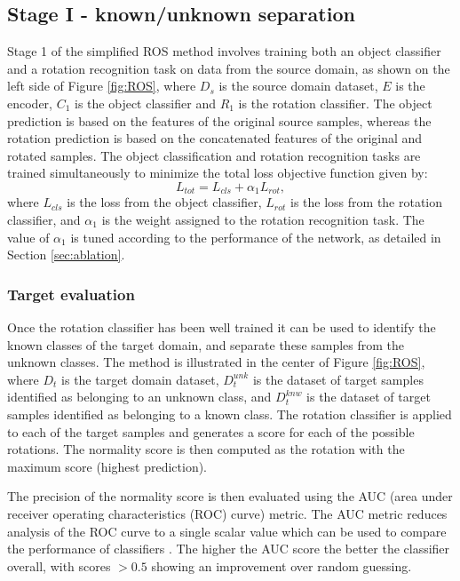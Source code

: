 \documentclass[10pt,twocolumn,letterpaper]{article}
\begin{document}
\subsection{Stage I - known/unknown separation}

Stage 1 of the simplified ROS method involves training both an object classifier and a rotation recognition task on data from the source domain, as shown on the left side of Figure \ref{fig:ROS}, where $D_s$ is the source domain dataset, $E$ is the encoder, $C_1$ is the object classifier and $R_1$ is the rotation classifier. The object prediction is based on the features of the original source samples, whereas the rotation prediction is based on the concatenated features of the original and rotated samples. The object classification and rotation recognition tasks are trained simultaneously to minimize the total loss objective function given by:
\begin{equation}
  L_{tot} = L_{cls} + \alpha_1 L_{rot} ,
  \label{eq:totalloss}
\end{equation}
where $L_{cls}$ is the loss from the object classifier, $L_{rot}$ is the loss from the rotation classifier, and $\alpha_1$ is the weight assigned to the rotation recognition task. The value of $\alpha_1$ is tuned according to the performance of the network, as detailed in Section \ref{sec:ablation}.


\subsubsection*{Target evaluation}

Once the rotation classifier has been well trained it can be used to identify the known classes of the target domain, and separate these samples from the unknown classes. The method is illustrated in the center of Figure \ref{fig:ROS}, where $D_t$ is the target domain dataset, $D_t^{unk}$ is the dataset of target samples identified as belonging to an unknown class, and $D^{knw}_t$ is the dataset of target samples identified as belonging to a known class. The rotation classifier is applied to each of the target samples and generates a score for each of the possible rotations. The normality score is then computed as the rotation with the maximum score (highest prediction).

The precision of the normality score is then evaluated using the AUC (area under receiver operating characteristics (ROC) curve) metric. The AUC metric reduces analysis of the ROC curve to a single scalar value which can be used to compare the performance of classifiers \cite{Fawcett2006}. The higher the AUC score the better the classifier overall, with scores $> 0.5$ showing an improvement over random guessing.
\end{document}
